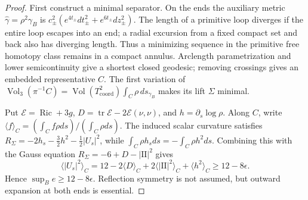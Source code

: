 \documentclass[a4paper,11pt]{article}
\numberwithin{equation}{section}
\theoremstyle{definition}
\newcommand{\Ric}{\operatorname{Ric}}
\newcommand{\Vol}{\operatorname{Vol}}
\newcommand{\tr}{\operatorname{tr}}
\begin{document}
\begin{proof}
First construct a minimal separator. On the ends the auxiliary metric $\widehat\gamma=\rho^2\gamma_B$ is
$c_\pm^2(e^{4t_\pm}dt_\pm^2+e^{6t_\pm}dz_\pm^2)$.
The length of a primitive loop diverges if the entire loop escapes into an end; a radial excursion from a fixed compact set and back also has diverging length.
Thus a minimizing sequence in the primitive free homotopy class remains in a compact annulus.
Arclength parametrization and lower semicontinuity give a shortest closed geodesic; removing crossings gives an embedded representative $C$.
The first variation of
$\Vol_3(\pi^{-1}C)=\operatorname{Vol}(T^2_{\mathrm{coord}})
 \int_C\rho\,ds_{\gamma_B}$ makes its lift $\Sigma$ minimal.

Put $\mathcal E=\Ric+3g$, $D=\tr\mathcal E-2\mathcal E(\nu,\nu)$, and $h=\partial_s\log\rho$.
Along $C$, write
$\langle f\rangle_C=(\int_C f\rho ds)/(\int_C\rho ds)$.
The induced scalar curvature satisfies
$R_\Sigma=-2h_s-\frac32h^2-\frac12|U_s|^2$, while
$\int_C\rho h_sds=-\int_C\rho h^2ds$.
Combining this with the Gauss equation $R_\Sigma=-6+D-|\mathrm{II}|^2$ gives
\[
 \langle |U_s|^2\rangle_C=12-2\langle D\rangle_C
 +2\langle|\mathrm{II}|^2\rangle_C+\langle h^2\rangle_C
 \ge12-8\epsilon.
\]
Hence $\sup_Be\ge12-8\epsilon$.
Reflection symmetry is not assumed, but outward expansion at both ends is essential.


\end{proof}
\end{document}
